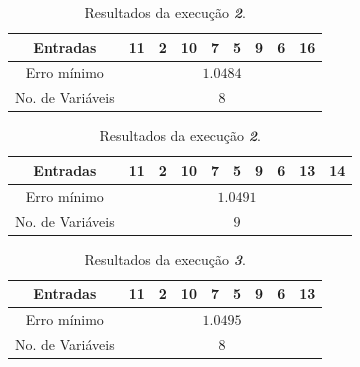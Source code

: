 \begin{enumerate}
\begin{enumerate}
			\begin{table}[H]
					\setlength\tabcolsep{4pt}
					\begin{minipage}{0.48\textwidth}
					    \centering
					    \footnotesize
						\caption{\label{tab:forward1_wine} Resultados da execução
						\textit{\textbf{1}}.}
					    \vspace{-6pt}
						\begin{tabular}{|c | c | c | c | c | c | c | c | c |}
						\hline
						Entradas & 11 & 2 & 10 & 7 & 5 & 9 & 6 & 16 \\
						\hline
						Erro mínimo & \multicolumn{8}{c|}{\(1.0484\)}  \\ \hline
						No. de Variáveis & \multicolumn{8}{c|}{\(8\)}  \\
						\hline
						
						\end{tabular}
					\end{minipage}	    
					\begin{minipage}{0.48\textwidth}
					    \centering
						\caption{\label{tab:forward2_wine} Resultados da execução
						\textit{\textbf{2}}.}
						\footnotesize
					    \vspace{-6pt}
						\begin{tabular}{|c | c | c | c | c | c | c | c | c | c |}
						\hline
						Entradas & 11 & 2 & 10 & 7 & 5 & 9 & 6 & 13 & 14 \\
						\hline
						Erro mínimo & \multicolumn{9}{c|}{\(1.0491\)}  \\ \hline
						No. de Variáveis & \multicolumn{9}{c|}{\(9\)}  \\
						\hline
						
						\end{tabular}	
					\end{minipage}	    
			    \end{table}     

		\vspace{-12pt}

			\begin{table}[H]
					\setlength\tabcolsep{4pt}
					\begin{minipage}{0.48\textwidth}
					    \centering
					    \footnotesize
						\caption{\label{tab:forward3_wine} Resultados da execução
						\textit{\textbf{3}}.}
					    \vspace{-6pt}
						\begin{tabular}{|c | c | c | c | c | c | c | c | c |}
						\hline
						Entradas & 11 & 2 & 10 & 7 & 5 & 9 & 6 & 13 \\
						\hline
						Erro mínimo & \multicolumn{8}{c|}{\(1.0495\)}  \\ \hline
						No. de Variáveis & \multicolumn{8}{c|}{\(8\)}  \\
						\hline
						

\end{tabular}
\end{minipage}
\end{table}
\end{enumerate}
\end{enumerate}
